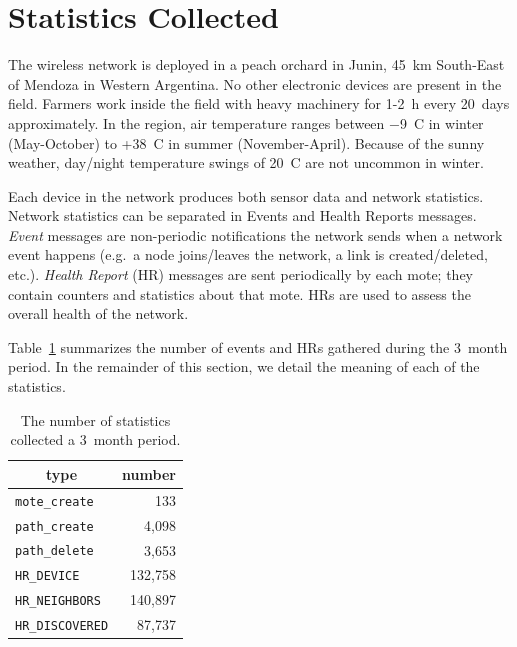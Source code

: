 \documentclass{sig-alternate}
\newcommand{\HRNEIGHBORS}         {{\tt HR\_NEIGHBORS}\xspace}
\newcommand{\HRDISCOVERED}        {{\tt HR\_DISCOVERED}\xspace}
\newcommand{\HRDEVICE}            {{\tt HR\_DEVICE}\xspace}
\newcommand{\pathcreate}          {{\tt path\_create}\xspace}
\newcommand{\pathdelete}          {{\tt path\_delete}\xspace}
\newcommand{\motecreate}          {{\tt mote\_create}\xspace}
\newcommand{\NUMHRNEIGHBORS}      {140,897\xspace}
\begin{document}
\section{Statistics Collected}
\label{sec:collected}


The wireless network is deployed in a peach orchard in Junin, 45~km South-East of Mendoza in Western Argentina.
No other electronic devices are present in the field.
Farmers work inside the field with heavy machinery for 1-2~h every 20~days approximately.
In the region, air temperature ranges between $-$9~C in winter (May-October) to +38~C in summer (November-April).
Because of the sunny weather, day/night temperature swings of 20~C are not uncommon in winter.


Each device in the network produces both sensor data and network statistics.
Network statistics can be separated in Events and Health Reports messages.
\textit{Event} messages are non-periodic notifications the network sends when a network event happens (e.g.~a node joins/leaves the network, a link is created/deleted, etc.).
\textit{Health Report} (HR) messages are sent periodically by each mote; they contain counters and statistics about that mote.
HRs are used to assess the overall health of the network.


Table~\ref{tab:msg_stats} summarizes the number of events and HRs gathered during the 3~month period.
In the remainder of this section, we detail the meaning of each of the statistics.

\begin{table}
    \centering
    \begin{tabular}{|l|r|}
        \hline
        \multicolumn{1}{|c|}{type} & \multicolumn{1}{|c|}{number} \\ \hline
        \hline
        \motecreate     &     133         \\ \hline
        \pathcreate     &   4,098         \\ \hline
        \pathdelete     &   3,653         \\ \hline
        \HRDEVICE       & 132,758         \\ \hline
        \HRNEIGHBORS    & \NUMHRNEIGHBORS \\ \hline
        \HRDISCOVERED   &  87,737         \\ \hline
    \end{tabular}
    \caption{The number of statistics collected a 3~month period.}
    \label{tab:msg_stats}
\end{table}
\end{document}
